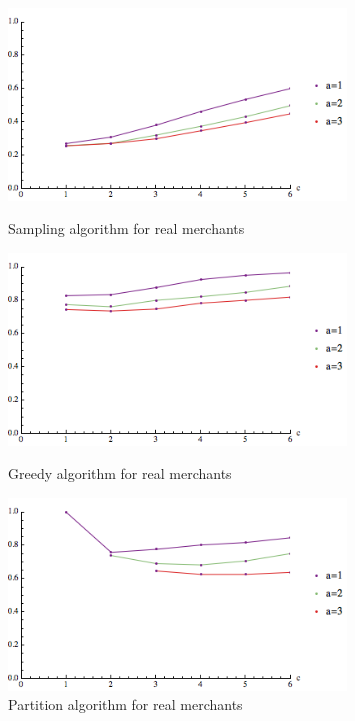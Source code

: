 \begin{figure}[t]
\centering
\begin{minipage}[h]{0.48\textwidth}
\centering
\includegraphics[width=0.8\textwidth]{images/real_sampling.png}
\caption{Sampling algorithm for real merchants}\label{fig:real_sampling}
\end{minipage}
\hspace{0cm}
\begin{minipage}[h]{0.48\textwidth}
\centering
\includegraphics[width=0.8\textwidth]{images/real_greedy.png}
\caption{Greedy algorithm for real merchants}\label{fig:real_greedy}
\end{minipage}
\hspace{0cm}
\centering
\begin{minipage}[h]{0.48\textwidth}
\centering
\includegraphics[width=0.8\textwidth]{images/real_partition.png}
\caption{Partition algorithm for real merchants}\label{fig:real_partition}
\end{minipage}
\vspace{-0.2in}
\end{figure} \vs


